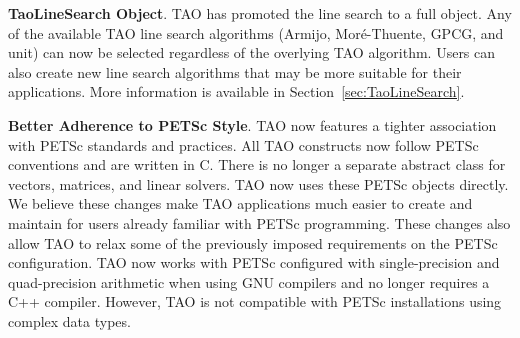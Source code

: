 \vspace{7mm}
\noindent \textbf{TaoLineSearch Object}. TAO has promoted the line search to a full object.  Any of the available 
TAO line search algorithms (Armijo, Mor\'e-Thuente, GPCG, and unit) can now 
be selected regardless of the overlying TAO algorithm.  Users can also
create new line search algorithms that may be more suitable for their
applications.  More information is available in 
Section~\ref{sec:TaoLineSearch}.

\vspace{7mm}
\noindent \textbf{Better Adherence to PETSc Style}. TAO now features a tighter association with PETSc standards and practices.  All 
TAO constructs now follow PETSc conventions and are written in C.  There is 
no longer a separate abstract class for vectors, matrices, and linear 
solvers. TAO now uses these PETSc objects directly.  We believe these 
changes make TAO applications much easier to create and maintain for 
users already familiar with PETSc programming. These changes also allow 
TAO to relax some of the previously imposed requirements on the PETSc 
configuration.  TAO now works with PETSc configured with single-precision 
and quad-precision arithmetic when using GNU compilers and no longer 
requires a C++ compiler.  However, TAO is not compatible with PETSc 
installations using complex data types.


